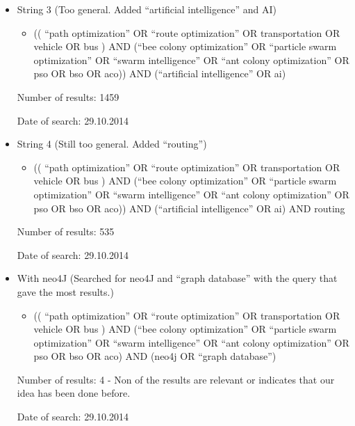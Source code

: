 \begin{itemize}
\item String 3 (Too general. Added ``artificial intelligence'' and AI)
\begin{itemize}
\item (( ``path optimization'' OR ``route optimization'' OR transportation OR vehicle OR bus ) AND (``bee colony optimization'' OR ``particle swarm optimization'' OR ``swarm intelligence'' OR ``ant colony optimization'' OR pso OR bso OR aco)) AND (``artificial intelligence'' OR ai)
\end{itemize}
\par Number of results: 1459
\par Date of search: 29.10.2014
\end{itemize}

\begin{itemize}
\item String 4 (Still too general. Added ``routing'')
\begin{itemize}
\item (( ``path optimization'' OR ``route optimization'' OR transportation OR vehicle OR bus ) AND (``bee colony optimization'' OR ``particle swarm optimization'' OR ``swarm intelligence'' OR ``ant colony optimization'' OR pso OR bso OR aco)) AND (``artificial intelligence'' OR ai) AND routing
\end{itemize}
\par Number of results: 535
\par Date of search: 29.10.2014
\end{itemize}

\begin{itemize}
\item With neo4J (Searched for neo4J and ``graph database'' with the query that gave the most results.)
\begin{itemize}
\item (( ``path optimization'' OR ``route optimization'' OR transportation OR vehicle OR bus ) AND (``bee colony optimization'' OR ``particle swarm optimization'' OR ``swarm intelligence'' OR ``ant colony optimization'' OR pso OR bso OR aco) AND (neo4j OR ``graph database'')
\end{itemize}
\par Number of results: 4 - Non of the results are relevant or indicates that our idea has been done before.
\par Date of search: 29.10.2014


\end{itemize}


